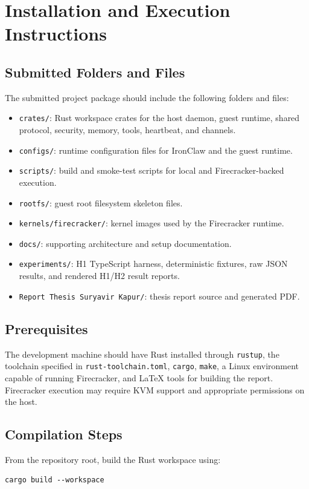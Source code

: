 
\chapter{Installation and Execution Instructions}
\label{AppendixA}

\section{Submitted Folders and Files}
The submitted project package should include the following folders and files:
\begin{itemize}
    \item \texttt{crates/}: Rust workspace crates for the host daemon, guest
    runtime, shared protocol, security, memory, tools, heartbeat, and channels.
    \item \texttt{configs/}: runtime configuration files for IronClaw and the
    guest runtime.
    \item \texttt{scripts/}: build and smoke-test scripts for local and
    Firecracker-backed execution.
    \item \texttt{rootfs/}: guest root filesystem skeleton files.
    \item \texttt{kernels/firecracker/}: kernel images used by the Firecracker
    runtime.
    \item \texttt{docs/}: supporting architecture and setup documentation.
    \item \texttt{experiments/}: H1 TypeScript harness, deterministic fixtures,
    raw JSON results, and rendered H1/H2 result reports.
    \item \texttt{Report Thesis Suryavir Kapur/}: thesis report source and
    generated PDF.
\end{itemize}

\section{Prerequisites}
The development machine should have Rust installed through \texttt{rustup}, the
toolchain specified in \texttt{rust-toolchain.toml}, \texttt{cargo},
\texttt{make}, a Linux environment capable of running Firecracker, and LaTeX
tools for building the report. Firecracker execution may require KVM support and
appropriate permissions on the host.

\section{Compilation Steps}
From the repository root, build the Rust workspace using:
\begin{verbatim}
cargo build --workspace
\end{verbatim}

